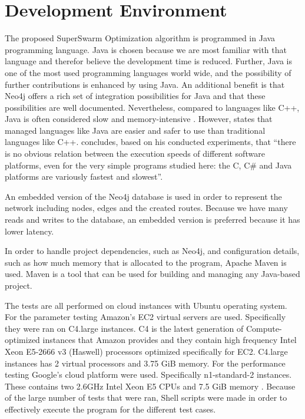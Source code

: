 \section{Development Environment}

The proposed SuperSwarm Optimization algorithm is programmed in Java programming language. Java is chosen because we are most familiar with that language and therefor believe the development time is reduced. Further, Java is one of the most used programming languages world wide, and the possibility of further contributions is enhanced by using Java. An additional benefit is that Neo4j offers a rich set of integration possibilities for Java and that these possibilities are well documented. Nevertheless, compared to languages like C++, Java is often considered slow and memory-intensive \citep{alnaser12}. However, \citet{sestoft10} states that managed languages like Java are easier and safer to use than traditional languages like C++. \citet{sestoft10} concludes, based on his conducted experiments, that ``there is no obvious relation between the execution speeds of different software platforms, even for the very simple programs studied here: the C, C\# and Java platforms are variously fastest and slowest''.

An embedded version of the Neo4j database is used in order to represent the network including nodes, edges and the created routes. Because we have many reads and writes to the database, an embedded version is preferred because it has lower latency.  

In order to handle project dependencies, such as Neo4j, and configuration details, such as how much memory that is allocated to the program, Apache Maven\citep{website:maven} is used. Maven is a tool that can be used for building and managing any Java-based project. 

The tests are all performed on cloud instances with Ubuntu operating system. For the parameter testing Amazon's EC2 virtual servers are used. Specifically they were ran on C4.large instances. C4 is the latest generation of Compute-optimized instances that Amazon provides and they contain high frequency Intel Xeon E5-2666 v3 (Haswell) processors optimized specifically for EC2\citep{website:amazon}. C4.large instances has 2 virtual processors and 3.75 GiB memory.
For the performance testing Google's cloud platform were used. Specifically n1-standard-2 instances. These contains two 2.6GHz Intel Xeon E5 CPUs and 7.5 GiB memory \citep{website:google}. Because of the large number of tests that were ran, Shell scripts were made in order to effectively execute the program for the different test cases. 




